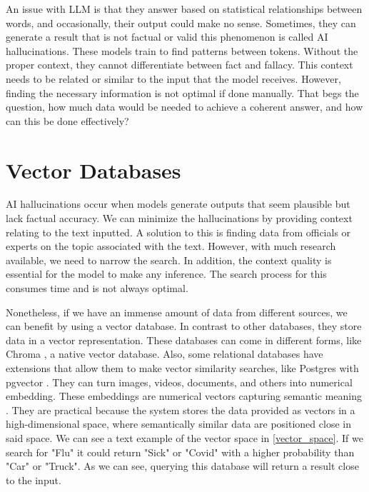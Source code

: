 An issue with LLM is that they answer based on statistical relationships between words, and occasionally, their output could make no sense. Sometimes, they can generate a result that is not factual
or valid this phenomenon is called AI hallucinations. These models train to find patterns between tokens. Without the proper context, they cannot differentiate between fact and fallacy. This context
needs to  be related or similar to the input that the model receives. However, finding the necessary information is not optimal if done manually. That begs the question, how much data would be needed
to achieve a coherent answer, and how can this be done effectively?


\section{Vector Databases}
AI hallucinations occur when models generate outputs that seem plausible but lack factual accuracy. We can minimize the hallucinations by providing context relating to the text inputted. A solution to this
is finding data from officials or experts on the topic associated with the text. However, with much research available, we need to narrow the search. In addition, the context quality is essential for the model to
make any inference. The search process for this consumes time and is not always optimal. 

Nonetheless, if we have an immense amount of data from different sources, we can benefit by using a vector database. In contrast to other databases, they store data in a vector representation.
These databases can come in different forms, like Chroma \cite{chroma}, a native vector database. Also, some relational databases have extensions that allow them to make vector similarity searches,
like Postgres with pgvector \cite{pgvector}. They can turn images, videos, documents, and others into numerical embedding. These embeddings are numerical vectors capturing semantic meaning \cite{10455990}.
They are practical because the system stores the data provided as vectors in a high-dimensional space, where semantically similar data are positioned close in said space. We can see a text example of the vector
space in \ref{vector_space}. If we search for "Flu" it could return "Sick" or "Covid" with a higher probability than "Car" or "Truck". As we can see, querying this database will return a result close to the input.

